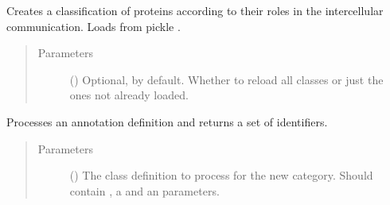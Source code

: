 \documentclass[letterpaper,10pt,english]{sphinxmanual}
\begin{document}
\begin{fulllineitems}
\begin{fulllineitems}
\begin{quote}
\begin{description}
\end{description}\end{quote}

\end{fulllineitems}


\begin{fulllineitems}
\label{\detokenize{reference:pypath.annot.CustomAnnotation.populate_classes}}
Creates a classification of proteins according to their roles
in the intercellular communication. Loads from pickle
.
\begin{quote}\begin{description}
\item[{Parameters}] \leavevmode
{} () \textendash{} Optional,  by default. Whether to reload all
classes or just the ones not already loaded.

\end{description}\end{quote}

\end{fulllineitems}


\begin{fulllineitems}
\label{\detokenize{reference:pypath.annot.CustomAnnotation.process_annot}}
Processes an annotation definition and returns a set of
identifiers.
\begin{quote}\begin{description}
\item[{Parameters}] \leavevmode
{} () \textendash{} The class definition to process for the new category. Should
contain , a  and an 
parameters.


\end{description}
\end{quote}
\end{fulllineitems}
\end{fulllineitems}
\end{document}
